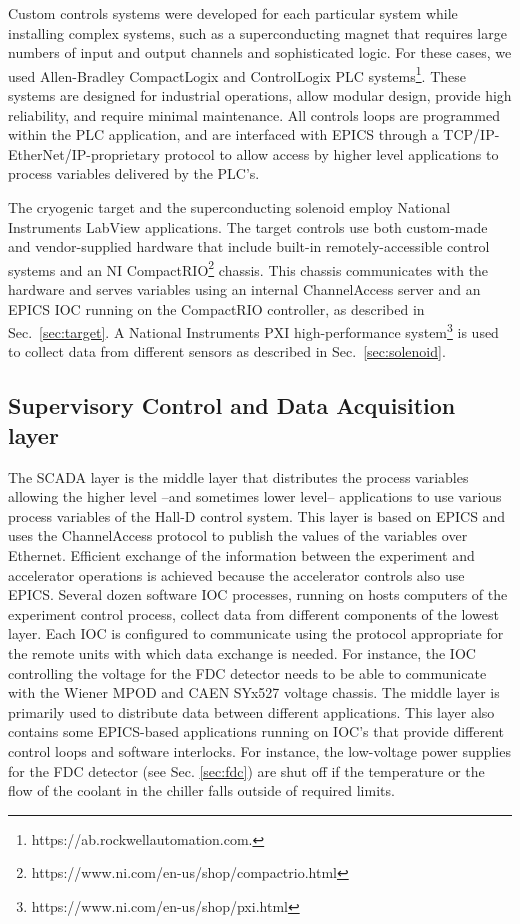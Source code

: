 Custom controls systems were developed for each particular system while installing complex systems, such as a superconducting magnet that requires large numbers of input and output channels and sophisticated logic.
For these cases, we used Allen-Bradley CompactLogix and ControlLogix PLC systems\footnote{https://ab.rockwellautomation.com.}. These systems are designed for industrial operations, allow modular design, provide high reliability, and require minimal maintenance. All controls loops are programmed within the PLC application, and are interfaced with EPICS through a TCP/IP-EtherNet/IP-proprietary protocol to allow access by higher level applications to process variables delivered by the PLC's.  

The cryogenic target and the superconducting solenoid employ National Instruments LabView applications. The target controls use both custom-made and vendor-supplied hardware that include built-in remotely-accessible control systems and an NI CompactRIO\footnote{https://www.ni.com/en-us/shop/compactrio.html} chassis. This chassis communicates with the hardware and serves variables using an internal ChannelAccess server and an EPICS IOC running on the CompactRIO controller, as described in Sec.~\ref{sec:target}. A National Instruments PXI high-performance system\footnote{https://www.ni.com/en-us/shop/pxi.html} is used to collect data from different sensors as described in Sec.~\ref{sec:solenoid}. 

\subsection{Supervisory Control and Data Acquisition layer \label{sec:archiver}}
The SCADA layer is the middle layer that distributes the process variables allowing the higher level --and sometimes lower level-- applications to use various process variables of the Hall-D control system. This layer is based on EPICS and uses the ChannelAccess protocol to publish the values of the variables over Ethernet. Efficient exchange of the information between the experiment and accelerator operations is achieved because the accelerator controls also use EPICS.
Several dozen software IOC processes, running on hosts computers of the experiment control process, collect data from different components of the lowest layer. Each IOC is configured to communicate using the protocol appropriate for the remote units with which data exchange is needed. For instance, the IOC controlling the voltage for the FDC detector needs to be able to communicate with the Wiener MPOD and CAEN SYx527 voltage chassis. The middle layer is primarily used to distribute data between different applications. This layer also contains some EPICS-based applications running on IOC's that provide different control loops and software interlocks.  For instance, the low-voltage power supplies for the FDC detector (see Sec. \ref{sec:fdc}) are shut off if the temperature or the flow of the coolant in the chiller falls outside of required limits. 
